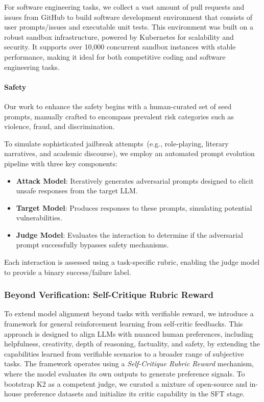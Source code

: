 For software engineering tasks, we collect a vast amount of pull requests and issues from GitHub to build software development environment that consists of user prompts/issues and executable unit tests.
This environment was built on a robust sandbox infrastructure, powered by Kubernetes for scalability and security. It supports over 10,000 concurrent sandbox instances with stable performance, making it ideal for both competitive coding and software engineering tasks. 




\paragraph{Safety}
Our work to enhance the safety begins with a human-curated set of seed prompts, manually crafted to encompass prevalent risk categories such as violence, fraud, and discrimination.

To simulate sophisticated jailbreak attempts~(e.g., role-playing, literary narratives, and academic discourse), we employ an automated prompt evolution pipeline with three key components:
\begin{itemize}
    \item \textbf{Attack Model}: Iteratively generates adversarial prompts designed to elicit unsafe responses from the target LLM.
    \item \textbf{Target Model}: Produces responses to these prompts, simulating potential vulnerabilities.
    \item \textbf{Judge Model}: Evaluates the interaction to determine if the adversarial prompt successfully bypasses safety mechanisms.
\end{itemize}

Each interaction is assessed using a task-specific rubric, enabling the judge model to provide a binary success/failure label.



\subsubsection{Beyond Verification: Self-Critique Rubric Reward}

To extend model alignment beyond tasks with verifiable reward, we introduce a framework for general reinforcement learning from self-critic feedbacks. This approach is designed to align LLMs with nuanced human preferences, including helpfulness, creativity, depth of reasoning, factuality, and safety, by extending the capabilities learned from verifiable scenarios to a broader range of subjective tasks.  The framework operates using a \textit{Self-Critique Rubric Reward} mechanism, where the model evaluates its own outputs to generate preference signals. 
To bootstrap K2 as a competent judge, we curated a mixture of open-source and in-house preference datasets and initialize its critic capability in the SFT stage.

